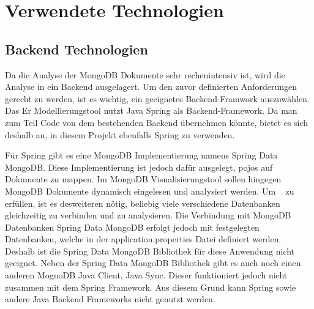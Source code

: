 \section{Verwendete Technologien}
\label{sec:verwendete_technologien}

\subsection{Backend Technologien}
\label{sec:verwendete_technologien_backend}

Da die Analyse der MongoDB Dokumente sehr rechenintensiv ist, wird die Analyse in ein Backend ausgelagert.
Um den zuvor definierten Anforderungen gerecht zu werden, ist es wichtig, ein geeignetes Backend-Framwork auszuwählen.
Das Er Modellierungstool nutzt Java Spring als Backend-Framework.
Da man zum Teil Code von dem bestehenden Backend übernehmen könnte, bietet es sich deshalb an, in diesem Projekt ebenfalls Spring zu verwenden.

Für Spring gibt es eine MongoDB Implementierung namens Spring Data MongoDB.
Diese Implementierung ist jedoch dafür ausgelegt, \ac{pojo}s auf Dokumente zu mappen.
Im MongoDB Visualisierungstool sollen hingegen MongoDB Dokumente dynamisch eingelesen und analysiert werden.
Um ~ zu erfüllen, ist es desweiteren nötig, beliebig viele verschiedene Datenbanken gleichzeitig zu verbinden und zu analysieren.
Die Verbindung mit MongoDB Datenbanken Spring Data MongoDB erfolgt jedoch mit festgelegten Datenbanken, welche in der application.properties Datei definiert werden.
~\autocite{spring:spring-data-mongodb}
Deshalb ist die Spring Data MongoDB Bibliothek für diese Anwendung nicht geeignet.
Neben der Spring Data MongoDB Bibliothek gibt es auch noch einen anderen MognoDB Java Client, Java Sync.
Dieser funktioniert jedoch nicht zusammen mit dem Spring Framework.
Aus diesem Grund kann Spring sowie andere Java Backend Frameworks nicht genutzt werden.


